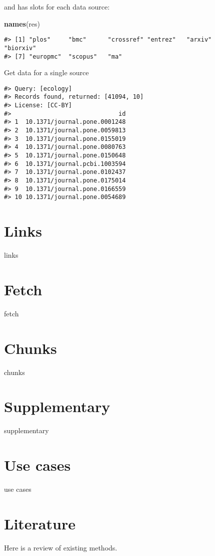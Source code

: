 \documentclass[]{book}
\newenvironment{Shaded}{\begin{snugshade}}{\end{snugshade}}
\newcommand{\KeywordTok}[1]{\textcolor[rgb]{0.13,0.29,0.53}{\textbf{#1}}}
\newcommand{\NormalTok}[1]{#1}
\newcommand{\OperatorTok}[1]{\textcolor[rgb]{0.81,0.36,0.00}{\textbf{#1}}}
\theoremstyle{definition}
\theoremstyle{definition}
\theoremstyle{definition}
\theoremstyle{remark}
\begin{document}
and has slots for each data source:

\begin{Shaded}
\begin{Highlighting}[]
\KeywordTok{names}\NormalTok{(res)}
\end{Highlighting}
\end{Shaded}

\begin{verbatim}
#> [1] "plos"     "bmc"      "crossref" "entrez"   "arxiv"    "biorxiv" 
#> [7] "europmc"  "scopus"   "ma"
\end{verbatim}

Get data for a single source

\begin{Shaded}
\end{Shaded}

\begin{verbatim}
#> Query: [ecology] 
#> Records found, returned: [41094, 10] 
#> License: [CC-BY] 
#>                              id
#> 1  10.1371/journal.pone.0001248
#> 2  10.1371/journal.pone.0059813
#> 3  10.1371/journal.pone.0155019
#> 4  10.1371/journal.pone.0080763
#> 5  10.1371/journal.pone.0150648
#> 6  10.1371/journal.pcbi.1003594
#> 7  10.1371/journal.pone.0102437
#> 8  10.1371/journal.pone.0175014
#> 9  10.1371/journal.pone.0166559
#> 10 10.1371/journal.pone.0054689
\end{verbatim}

\hypertarget{links}{%
\chapter{Links}\label{links}}

links

\hypertarget{fetch}{%
\chapter{Fetch}\label{fetch}}

fetch

\hypertarget{chunks}{%
\chapter{Chunks}\label{chunks}}

chunks

\hypertarget{supplementary}{%
\chapter{Supplementary}\label{supplementary}}

supplementary

\hypertarget{use-cases}{%
\chapter{Use cases}\label{use-cases}}

use cases

\hypertarget{literature}{%
\chapter{Literature}\label{literature}}

Here is a review of existing methods.


\end{document}
